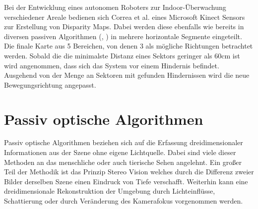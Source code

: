 \noindent
Bei der Entwicklung eines autonomen Roboters zur Indoor-Überwachung verschiedener Areale bedienen sich Correa et al. \cite{correa2012mobile} eines Microsoft Kinect Sensors zur Erstellung von Disparity Maps. Dabei werden diese ebenfalls wie bereits in diversen passiven Algorithmen (\cite{pire2012stereo}, \cite{kostavelis2010comparative}) in mehrere horizontale Segmente eingeteilt. Die finale Karte aus 5 Bereichen, von denen 3 als mögliche Richtungen betrachtet werden. 
Sobald die die minimalste Distanz eines Sektors geringer als 60cm ist wird angenommen, dass sich das System vor einem Hindernis befindet. Ausgehend von der Menge an Sektoren mit gefunden Hindernissen wird die neue Bewegungsrichtung angepasst.

\section{Passiv optische Algorithmen}
\label{sec:sensor_basierte_he}
Passiv optische Algorithmen beziehen sich auf die Erfassung dreidimensionaler Informationen aus der Szene ohne eigene Lichtquelle. Dabei sind viele dieser Methoden an das menschliche oder auch tierische Sehen angelehnt. Ein großer Teil der Methodik ist das Prinzip Stereo Vision welches durch die Differenz zweier Bilder derselben Szene einen Eindruck von Tiefe verschafft. Weiterhin kann eine dreidimensionale Rekonstruktion der Umgebung durch Lichteinflüsse, Schattierung oder durch Veränderung des Kamerafokus vorgenommen werden.\\


